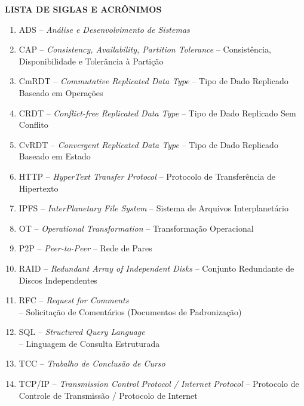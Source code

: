 \begin{titlepage}
    \centering
    {\largefont \textbf{LISTA DE SIGLAS E ACRÔNIMOS}}

    \vspace{0.5cm}

    \justifying
    \begin{enumerate}
        \item ADS – \textit{Análise e Desenvolvimento de Sistemas}
        \item CAP – \textit{Consistency, Availability, Partition Tolerance} – Consistência, Disponibilidade e Tolerância à Partição
        \item CmRDT – \textit{Commutative Replicated Data Type} – Tipo de Dado Replicado Baseado em Operações
        \item CRDT – \textit{Conflict-free Replicated Data Type} – Tipo de Dado Replicado Sem Conflito
        \item CvRDT – \textit{Convergent Replicated Data Type} – Tipo de Dado Replicado Baseado em Estado
        \item HTTP – \textit{HyperText Transfer Protocol} – Protocolo de Transferência de Hipertexto
        \item IPFS – \textit{InterPlanetary File System} – Sistema de Arquivos Interplanetário
        \item OT – \textit{Operational Transformation} – Transformação Operacional
        \item P2P – \textit{Peer-to-Peer} – Rede de Pares
        \item RAID – \textit{Redundant Array of Independent Disks} – Conjunto Redundante de Discos Independentes
        \item RFC – \textit{Request for Comments} \\ – Solicitação de Comentários (Documentos de Padronização)
        \item SQL – \textit{Structured Query Language}\\ – Linguagem de Consulta Estruturada
        \item TCC – \textit{Trabalho de Conclusão de Curso}
        \item TCP/IP – \textit{Transmission Control Protocol / Internet Protocol} – Protocolo de Controle de Transmissão / Protocolo de Internet
    \end{enumerate}

\end{titlepage}
